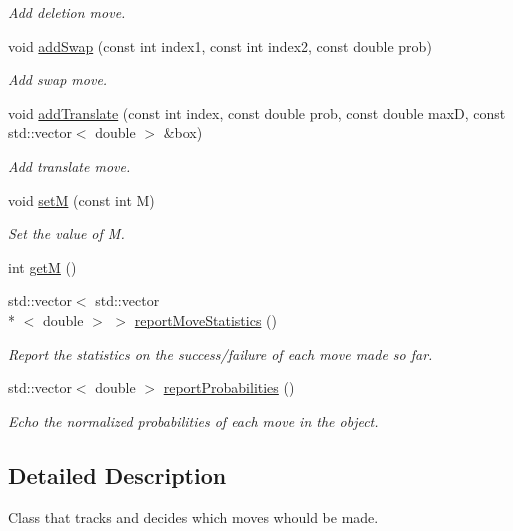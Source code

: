 \begin{DoxyCompactItemize}
\begin{DoxyCompactList}\small\item\em Add deletion move. \end{DoxyCompactList}\item 
void \hyperlink{classmoves_a03cebfa2d8d1cecf253df573fdecc5d0}{add\-Swap} (const int index1, const int index2, const double prob)
\begin{DoxyCompactList}\small\item\em Add swap move. \end{DoxyCompactList}\item 
void \hyperlink{classmoves_a91bb7969368fdbb66920a11d79fe7552}{add\-Translate} (const int index, const double prob, const double max\-D, const std\-::vector$<$ double $>$ \&box)
\begin{DoxyCompactList}\small\item\em Add translate move. \end{DoxyCompactList}\item 
void \hyperlink{classmoves_ab603c6ce829075e3232ff41a7d5e2aab}{set\-M} (const int M)
\begin{DoxyCompactList}\small\item\em Set the value of M. \end{DoxyCompactList}\item 
int \hyperlink{classmoves_a57e814fe08153419f92a983cbf33796d}{get\-M} ()
\item 
std\-::vector$<$ std\-::vector\\*
$<$ double $>$ $>$ \hyperlink{classmoves_ad3e937628d85cdbbe02732648cb533e2}{report\-Move\-Statistics} ()
\begin{DoxyCompactList}\small\item\em Report the statistics on the success/failure of each move made so far. \end{DoxyCompactList}\item 
std\-::vector$<$ double $>$ \hyperlink{classmoves_a84f8198bd43c0f6b8b52dce3abdfa6a4}{report\-Probabilities} ()
\begin{DoxyCompactList}\small\item\em Echo the normalized probabilities of each move in the object. \end{DoxyCompactList}\end{DoxyCompactItemize}


\subsection{Detailed Description}
Class that tracks and decides which moves whould be made. 

